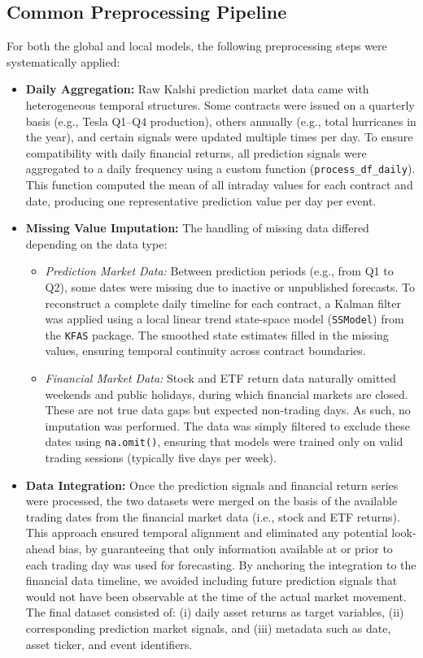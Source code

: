 \documentclass[12pt]{report}
\begin{document}
\subsection{Common Preprocessing Pipeline}
For both the global and local models, the following preprocessing steps were systematically applied:

\begin{itemize}
    \item \textbf{Daily Aggregation:} Raw Kalshi prediction market data came with heterogeneous temporal structures. Some contracts were issued on a quarterly basis (e.g., Tesla Q1–Q4 production), others annually (e.g., total hurricanes in the year), and certain signals were updated multiple times per day. To ensure compatibility with daily financial returns, all prediction signals were aggregated to a daily frequency using a custom function (\texttt{process\_df\_daily}). This function computed the mean of all intraday values for each contract and date, producing one representative prediction value per day per event.

    \item \textbf{Missing Value Imputation:} The handling of missing data differed depending on the data type:
    \begin{itemize}
        \item \textit{Prediction Market Data:} Between prediction periods (e.g., from Q1 to Q2), some dates were missing due to inactive or unpublished forecasts. To reconstruct a complete daily timeline for each contract, a Kalman filter was applied using a local linear trend state-space model (\texttt{SSModel}) from the \texttt{KFAS} package. The smoothed state estimates filled in the missing values, ensuring temporal continuity across contract boundaries.
        
        \item \textit{Financial Market Data:} Stock and ETF return data naturally omitted weekends and public holidays, during which financial markets are closed. These are not true data gaps but expected non-trading days. As such, no imputation was performed. The data was simply filtered to exclude these dates using \texttt{na.omit()}, ensuring that models were trained only on valid trading sessions (typically five days per week).
    \end{itemize}

    \item \textbf{Data Integration:} Once the prediction signals and financial return series were processed, the two datasets were merged on the basis of the available trading dates from the financial market data (i.e., stock and ETF returns). This approach ensured temporal alignment and eliminated any potential look-ahead bias, by guaranteeing that only information available at or prior to each trading day was used for forecasting. By anchoring the integration to the financial data timeline, we avoided including future prediction signals that would not have been observable at the time of the actual market movement. The final dataset consisted of: (i) daily asset returns as target variables, (ii) corresponding prediction market signals, and (iii) metadata such as date, asset ticker, and event identifiers.
\end{itemize}
\end{document}
